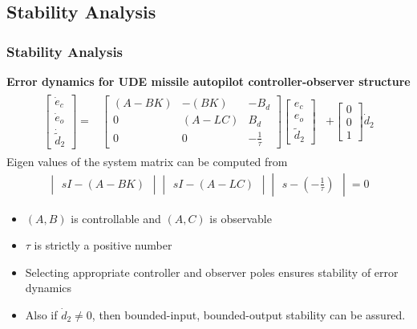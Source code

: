 \documentclass[table,10pt,red]{beamer}	%
\begin{document}
\subsection{Stability Analysis}
\begin{frame}
\frametitle{Stability Analysis}
\textbf{Error dynamics for UDE missile autopilot controller-observer structure}
\begin{eqnarray}
\begin{aligned}
\begin{bmatrix}
\dot{e}_c \\
\dot{e}_o \\
\dot{\tilde{d}}_2
\end{bmatrix} =& 
\begin{bmatrix}
(A - BK) & -(BK) & -B_d \\
0 & (A - LC) & B_d \\
0 & 0 & -\frac{1}{\tau}
\end{bmatrix}
\begin{bmatrix}
e_c \\
e_o \\
\tilde{d}_2
\end{bmatrix}	
& + 
\begin{bmatrix}
0 \\
0 \\
1
\end{bmatrix} \dot{d}_2 \label{sr8}
\end{aligned}
\end{eqnarray}
Eigen values of the system matrix can be computed from
\begin{eqnarray}
\begin{vmatrix}
sI - (A - BK)
\end{vmatrix}
\begin{vmatrix}
sI - (A - LC)
\end{vmatrix}
\begin{vmatrix}
s - (-\frac{1}{\tau})
\end{vmatrix} = 0 \label{sr9}
\end{eqnarray}

\begin{itemize}
	\item $(A, B)$ is controllable and $(A, C)$ is observable
	\item $\tau$ is strictly a positive number
	\item Selecting appropriate controller and observer poles ensures stability of error dynamics
	\item Also if $\dot{d}_2 \ne 0$, then bounded-input, bounded-output stability can be assured. 
\end{itemize}


\end{frame}
\end{document}
